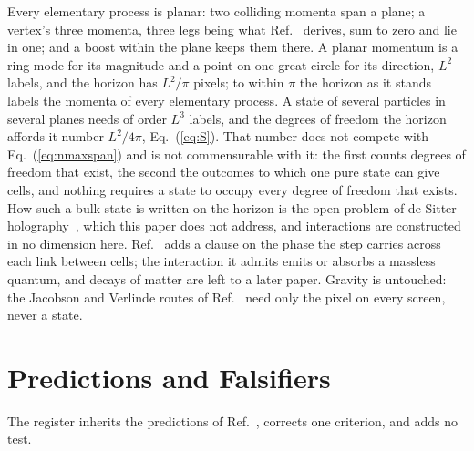 \documentclass[aps,prd,twocolumn,superscriptaddress,nofootinbib]{revtex4-2}
\begin{document}
Every elementary process is planar: two colliding momenta span a plane; a vertex's three momenta, three legs being what Ref.~\cite{korytko2026d} derives, sum to zero and lie in one; and a boost within the plane keeps them there. A planar momentum is a ring mode for its magnitude and a point on one great circle for its direction, $L^2$ labels, and the horizon has $L^2/\pi$ pixels; to within $\pi$ the horizon as it stands labels the momenta of every elementary process. A state of several particles in several planes needs of order $L^3$ labels, and the degrees of freedom the horizon affords it number $L^2/4\pi$, Eq.~(\ref{eq:S}). That number does not compete with Eq.~(\ref{eq:nmaxspan}) and is not commensurable with it: the first counts degrees of freedom that exist, the second the outcomes to which one pure state can give cells, and nothing requires a state to occupy every degree of freedom that exists. How such a bulk state is written on the horizon is the open problem of de Sitter holography~\cite{bousso1999,banksfischler2001,parikh2003}, which this paper does not address, and interactions are constructed in no dimension here. Ref.~\cite{korytko2026d} adds a clause on the phase the step carries across each link between cells; the interaction it admits emits or absorbs a massless quantum, and decays of matter are left to a later paper. Gravity is untouched: the Jacobson and Verlinde routes of Ref.~\cite{korytko2026} need only the pixel on every screen, never a state.

\section{Predictions and Falsifiers}
\label{sec:pred}

The register inherits the predictions of Ref.~\cite{korytko2026}, corrects one criterion, and adds no test.
\end{document}
